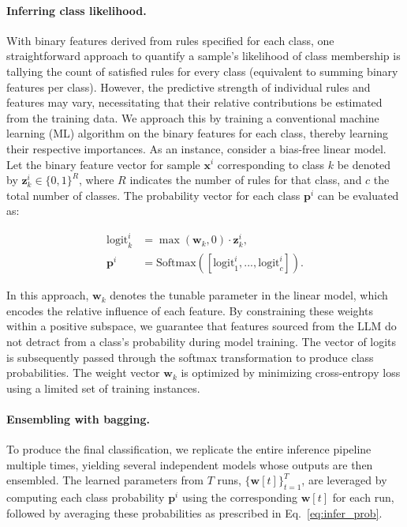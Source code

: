 \paragraph{Inferring class likelihood.} With binary features derived from rules specified for each class, one straightforward approach to quantify a sample’s likelihood of class membership is tallying the count of satisfied rules for every class (equivalent to summing binary features per class). However, the predictive strength of individual rules and features may vary, necessitating that their relative contributions be estimated from the training data. We approach this by training a conventional machine learning (ML) algorithm on the binary features for each class, thereby learning their respective importances. As an instance, consider a bias-free linear model. Let the binary feature vector for sample $\mathbf{x}^i$ corresponding to class $k$ be denoted by $\mathbf{z}_k^i \in \{0, 1\}^R$, where $R$ indicates the number of rules for that class, and $c$ the total number of classes. The probability vector for each class $\mathbf{p}^i$ can be evaluated as:

\begin{align}
\text{logit}_k^i &= \max(\mathbf{w}_k, 0) \cdot \mathbf{z}_k^i, \nonumber \\
\mathbf{p}^i &= \text{Softmax}({[\text{logit}_{1}^i, ..., \text{logit}_{c}^i]}). \label{eq:infer_prob}
\end{align}

In this approach, $\mathbf{w}_k$ denotes the tunable parameter in the linear model, which encodes the relative influence of each feature. By constraining these weights within a positive subspace, we guarantee that features sourced from the LLM do not detract from a class’s probability during model training. The vector of logits is subsequently passed through the softmax transformation to produce class probabilities. The weight vector $\mathbf{w}_k$ is optimized by minimizing cross-entropy loss using a limited set of training instances.

\vspace*{-0.12in}
\paragraph{Ensembling with bagging.} To produce the final classification, we replicate the entire inference pipeline multiple times, yielding several independent models whose outputs are then ensembled. The learned parameters from $T$ runs, $\{\mathbf{w}[t]\}_{t=1}^T$, are leveraged by computing each class probability $\mathbf{p}^i$ using the corresponding $\mathbf{w}[t]$ for each run, followed by averaging these probabilities as prescribed in Eq.~\ref{eq:infer_prob}.


